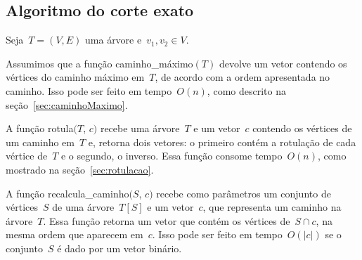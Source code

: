 	\bigskip
	\bigskip
	\bigskip
	\bigskip
	\bigskip

	\subsection{Algoritmo do corte exato}

		Seja~${T=(V,E)}$ uma árvore e~${v_1,v_2\in V}$.

		Assumimos que a função {\sc caminho\_máximo}$(T)$ 
		devolve um vetor contendo os vértices do caminho 
		máximo em~$T$, de acordo com a ordem apresentada no caminho.
		Isso pode ser feito em tempo~$O(n)$, como descrito na 
		seção~\ref{sec:caminhoMaximo}.

		A função {\sc rotula}$(T$, $c)$ recebe uma árvore~$T$ e um vetor~$c$
		contendo os vértices de um caminho em~$T$ e,
		retorna dois vetores: o primeiro contém a rotulação de cada vértice 
		de~$T$ e o segundo, o inverso. 
		Essa função consome tempo~$O(n)$, como mostrado na 
		seção~\ref{sec:rotulacao}.

		A função {\sc recalcula\_caminho}$(S$, $c)$
		recebe como parâmetros um conjunto de vértices~$S$ de uma árvore~$T[S]$ 
		e um vetor~$c$, que representa um caminho na árvore~$T$.
		Essa função retorna um vetor que contém os vértices de~$S\cap c$, na mesma 
		ordem que aparecem em~$c$. 
		Isso pode ser feito em tempo~$O(|c|)$ se 
		o conjunto~$S$ é dado por um vetor binário.





